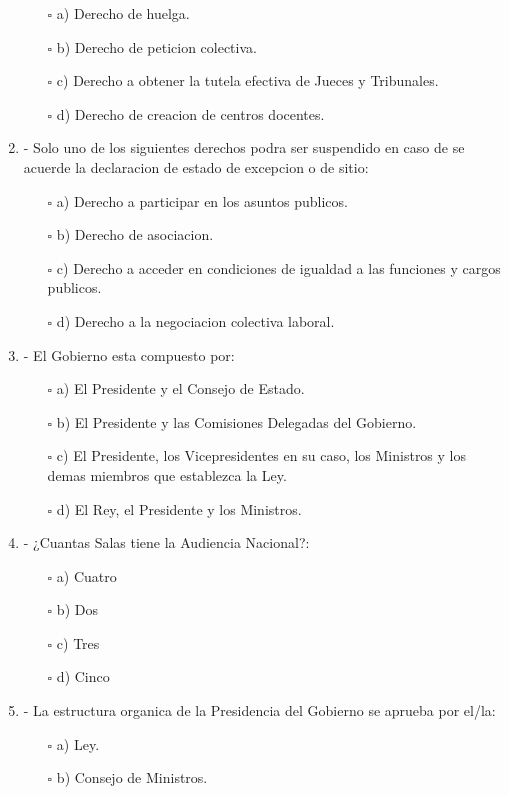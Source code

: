 \documentclass[0.01pt,a4paper,spanish]{article}
\begin{document}
\begin{enumerate}
\begin{itemize}
\item [$\square$] a) Derecho de huelga.
\item [$\square$] b) Derecho de peticion colectiva.
\item [$\square$] c) Derecho a obtener la tutela efectiva de Jueces y Tribunales.
\item [$\square$] d) Derecho de creacion de centros docentes.
\end{itemize}
\item - Solo uno de los siguientes derechos podra ser suspendido en caso de se acuerde la declaracion de estado de excepcion o de sitio:
\begin{itemize} 
\item [$\square$] a) Derecho a participar en los asuntos publicos.
\item [$\square$] b) Derecho de asociacion.
\item [$\square$] c) Derecho a acceder en condiciones de igualdad a las funciones y cargos publicos.
\item [$\square$] d) Derecho a la negociacion colectiva laboral.
\end{itemize}
\item - El Gobierno esta compuesto por:
\begin{itemize} 
\item [$\square$] a) El Presidente y el Consejo de Estado.
\item [$\square$] b) El Presidente y las Comisiones Delegadas del Gobierno.
\item [$\square$] c) El Presidente, los Vicepresidentes en su caso, los Ministros y los demas miembros que establezca la Ley.
\item [$\square$] d) El Rey, el Presidente y los Ministros.
\end{itemize}
\item - ¿Cuantas Salas tiene la Audiencia Nacional?:
\begin{itemize} 
\item [$\square$] a) Cuatro
\item [$\square$] b) Dos
\item [$\square$] c) Tres
\item [$\square$] d) Cinco
\end{itemize}
\item - La estructura organica de la Presidencia del Gobierno se aprueba por el/la:
\begin{itemize} 
\item [$\square$] a) Ley.
\item [$\square$] b) Consejo de Ministros.

\end{itemize}
\end{enumerate}
\end{document}
